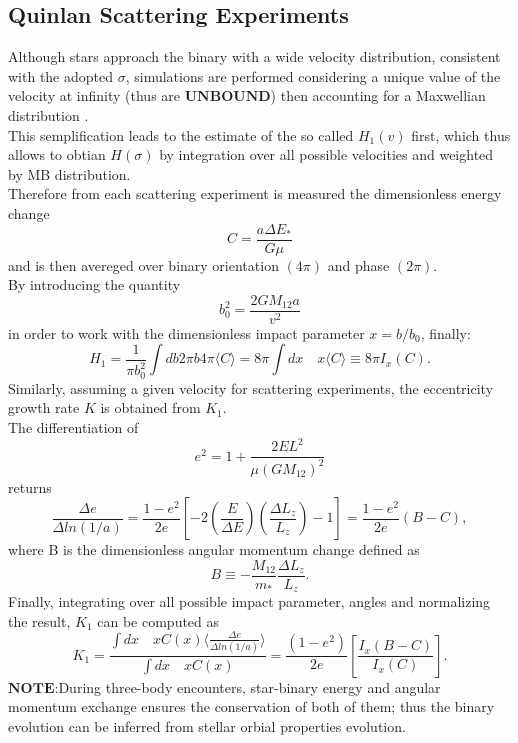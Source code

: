 \subsection{Quinlan Scattering Experiments}
Although stars approach the binary with a wide velocity distribution, consistent with the adopted $\sigma$, simulations are performed considering a unique value of the velocity at infinity (thus are $\mathbf{UNBOUND}$) then accounting for a Maxwellian distribution \cite{Quinlan_1996}.\\This semplification leads to the estimate of the so called $H_1(v)$ first, which thus allows to obtian $H(\sigma)$ by integration over all possible velocities and weighted by MB distribution.\\Therefore from each scattering experiment is measured the dimensionless energy change 
\begin{equation}\label{C quinlan}
    C=\frac{a\Delta E_*}{G\mu}
\end{equation}
and is then avereged over binary orientation $(4\pi)$ and phase $(2\pi)$.\\By introducing the quantity
\begin{equation}
    b_0^2=\frac{2GM_{12}a}{v^2}
\end{equation}
in order to work with the dimensionless impact parameter $x=b/b_0$, finally:
\begin{equation}
    H_1=\frac{1}{\pi b_0^2}\int db2\pi b 4 \pi \langle C\rangle=8 \pi \int dx\quad x \langle C\rangle\equiv8\pi I_x(C).
\end{equation}
Similarly, assuming a given velocity for scattering experiments, the eccentricity growth rate $K$ is obtained from $K_1$.\\The differentiation of
\begin{equation}
    e^2=1+\frac{2EL^2}{\mu(GM_{12})^2}
\end{equation}
returns
\begin{equation}
    \frac{\Delta e}{\Delta ln(1/a)}=\frac{1-e^2}{2e}\left[-2\left(\frac{E}{\Delta E}\right)\left(\frac{\Delta L_z}{L_z}\right)-1\right]=\frac{1-e^2}{2e}(B-C),
\end{equation}
where B is the dimensionless angular momentum change defined as 
\begin{equation}\label{B quinlan}
    B\equiv-\frac{M_{12}}{m_*}\frac{\Delta L_z}{L_z}.
\end{equation}
Finally, integrating over all possible impact parameter, angles and normalizing the result, $K_1$ can be computed as
\begin{equation}
    K_1=\frac{\int dx\quad xC(x)\langle \frac{\Delta e}{\Delta ln(1/a)}\rangle}{\int dx\quad xC(x)}=\frac{(1-e^2)}{2e}\left[\frac{I_x(B-C)}{I_x(C)}\right].
\end{equation}
$\mathbf{NOTE}$:During three-body encounters, star-binary energy and angular momentum exchange ensures the conservation of both of them; thus the binary evolution can be inferred from stellar orbial properties evolution.


